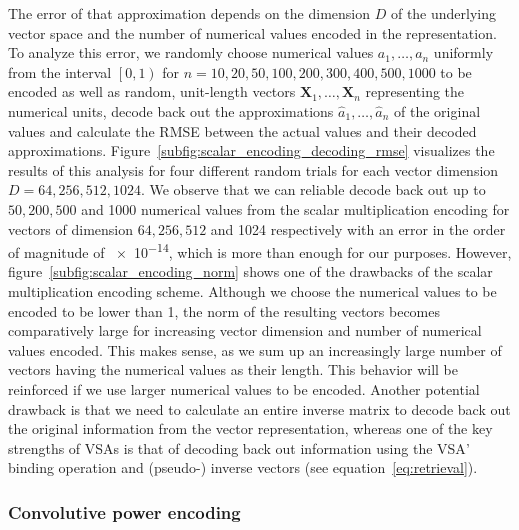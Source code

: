 The error of that approximation depends on the dimension $D$ of the underlying vector space and the number of numerical values encoded in the representation.
To analyze this error, we randomly choose numerical values $a_{1}, \ldots, a_{n}$ uniformly from the interval $ \left[0, 1\right)$ for $n=10, 20, 50,100,200,300,400,500,1000$ to be encoded as well as random, unit-length vectors $\mathbf{X}_{1}, \ldots, \mathbf{X}_{n}$ representing the numerical units, decode back out the approximations $\hat{a}_{1}, \ldots, \hat{a}_{n}$ of the original values and calculate the \ac{RMSE} between the actual values and their decoded approximations.
Figure~\ref{subfig:scalar_encoding_decoding_rmse} visualizes the results of this analysis for four different random trials for each vector dimension  $D=64, 256, 512, 1024$.
We observe that we can reliable decode back out up to $50, 200, 500$ and \num{1000} numerical values from the scalar multiplication encoding for vectors of dimension $64, 256, 512$ and \num{1024} respectively with an error in the order of magnitude of \num{e-14}, which is more than enough for our purposes.
However, figure~\ref{subfig:scalar_encoding_norm} shows one of the drawbacks of the scalar multiplication encoding scheme.
Although we choose the numerical values to be encoded to be lower than \num{1}, the norm of the resulting vectors becomes comparatively large for increasing vector dimension and number of numerical values encoded.
This makes sense, as we sum up an increasingly large number of vectors having the numerical values as their length.
This behavior will be reinforced if we use larger numerical values to be encoded.
Another potential drawback is that we need to calculate an entire inverse matrix to decode back out the original information from the vector representation, whereas one of the key strengths of \acp{VSA} is that of decoding back out information using the \ac{VSA}' binding operation and (pseudo-) inverse vectors (see equation~\eqref{eq:retrieval}).

\subsubsection{Convolutive power encoding}%
\label{ssubsec:convolutive_power_encoding}

